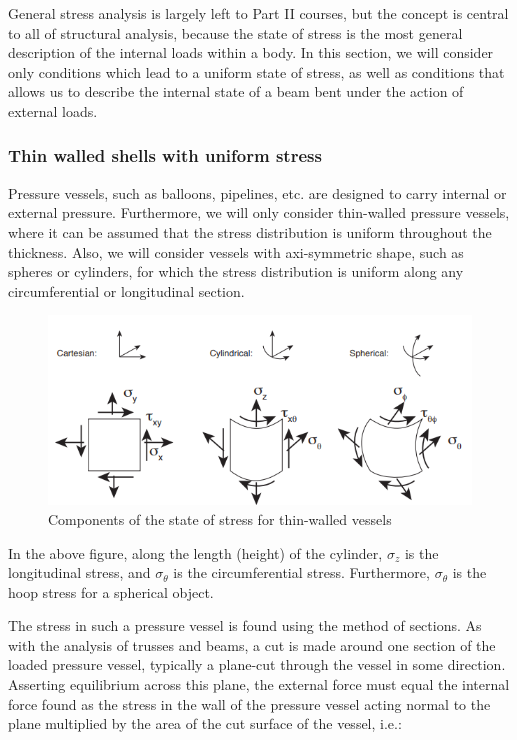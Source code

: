 \documentclass{article}
\begin{document}
General stress analysis is largely left to Part II courses, but the concept is central to all of structural analysis, because the state of stress is the most general description of the internal loads within a body. In this section, we will consider only conditions which lead to a uniform state of stress, as well as conditions that allows us to describe the internal state of a beam bent under the action of external loads.

\subsubsection{Thin walled shells with uniform stress}

Pressure vessels, such as balloons, pipelines, etc. are designed to carry internal or external pressure. Furthermore, we will only consider thin-walled pressure vessels, where it can be assumed that the stress distribution is uniform throughout the thickness. Also, we will consider vessels with axi-symmetric shape, such as spheres or cylinders, for which the stress distribution is uniform along any circumferential or longitudinal section.

\begin{figure}[h]
    \centering
    \includegraphics{images/stress3.png}
    \caption{Components of the state of stress for thin-walled vessels}
    \label{fig:enter-label}
\end{figure}

In the above figure, along the length (height) of the cylinder, $\sigma_z$ is the longitudinal stress, and $\sigma_\theta$ is the circumferential stress. Furthermore, $\sigma_\theta$ is the hoop stress for a spherical object.

The stress in such a pressure vessel is found using the method of sections. As with the analysis of trusses and beams, a cut is made around one section of the loaded pressure vessel, typically a plane-cut through the vessel in some direction. Asserting equilibrium across this plane, the external force must equal the internal force found as the stress in the wall of the pressure vessel acting normal to the plane multiplied by the area of the cut surface of the vessel, i.e.:
\end{document}
